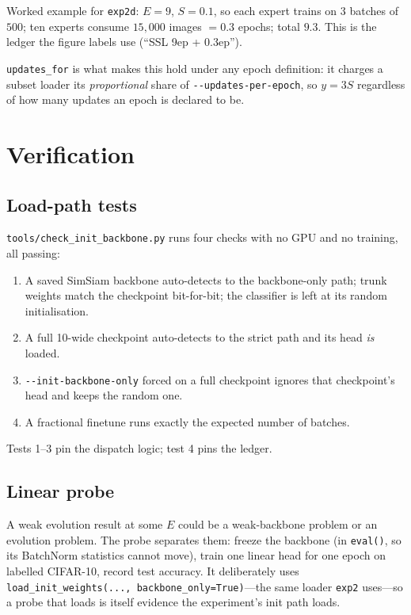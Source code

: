 \documentclass[11pt,a4paper]{article}
\newcommand{\code}[1]{\texttt{\small #1}}
\newcommand{\file}[1]{\texttt{\small #1}}
\begin{document}
Worked example for \code{exp2d}: $E{=}9$, $S{=}0.1$, so each expert trains on
$3$ batches of $500$; ten experts consume $15{,}000$ images $=0.3$ epochs; total
$9.3$. This is the ledger the figure labels use (``SSL 9ep + 0.3ep'').

\code{updates\_for} is what makes this hold under any epoch definition: it
charges a subset loader its \emph{proportional} share of
\code{-{}-updates-per-epoch}, so $y = 3S$ regardless of how many updates an
epoch is declared to be.

\section{Verification}

\subsection{Load-path tests}

\file{tools/check\_init\_backbone.py} runs four checks with no GPU and no
training, all passing:

\begin{enumerate}[leftmargin=*]
\item A saved SimSiam backbone auto-detects to the backbone-only path; trunk
      weights match the checkpoint bit-for-bit; the classifier is left at its
      random initialisation.
\item A full 10-wide checkpoint auto-detects to the strict path and its head
      \emph{is} loaded.
\item \code{-{}-init-backbone-only} forced on a full checkpoint ignores that
      checkpoint's head and keeps the random one.
\item A fractional finetune runs exactly the expected number of batches.
\end{enumerate}

Tests 1--3 pin the dispatch logic; test 4 pins the ledger.

\subsection{Linear probe}

A weak evolution result at some $E$ could be a weak-backbone problem or an
evolution problem. The probe separates them: freeze the backbone (in
\code{eval()}, so its BatchNorm statistics cannot move), train one linear head
for one epoch on labelled CIFAR-10, record test accuracy. It deliberately uses
\code{load\_init\_weights(..., backbone\_only=True)}---the same loader
\code{exp2} uses---so a probe that loads is itself evidence the experiment's
init path loads.
\end{document}
